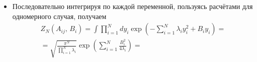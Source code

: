 \documentclass[a4paper]{article}
\begin{document}
\begin{itemize}
Диагональный вид матрицы $A$
 \[
	 \operatorname{diag}(\lambda_i)=
	 \begin{pmatrix} 12 & 0 & 0 \\ 0 & 6 & 0 \\ 0 & 0 & 2 \end{pmatrix} 
.\] 
\begin{multline*}
	A_{ij}x_i x_{j}=\mathbf{x}^TA\mathbf{x}=
	\mathbf{x}^T S^{-1} \operatorname{diag}(\lambda_i)S \mathbf{x}
	\xlongequal[]{S \text{ --- орт.}}
	\mathbf{x}^T S^T\operatorname{diag}(\lambda_i)S\mathbf{x}=\\=
	(S\mathbf{x})^T\operatorname{diag}(\lambda_i)(S\mathbf{x})\xlongequal[]{\mathbf{y}=S\mathbf{x}}\sum_{i=1}^{3} \lambda_i y_i^2
.\end{multline*} 
Удачной заменой координат в данном случае кажется $y_i=S_{ij} x_j$. Тогда выражение для произвольного кореллятора принимает вид
\begin{multline*}
\left<x_{a_1}x_{a_2}x_{a_3}\ldots x_{a_n} \right> =\\=
\frac{1}{Z_N(A_{ij})}
\int |\det S| \prod_{i=1}^{N}  dy_i \prod_{i=1}^{n} y_{a_i}
\exp \left(- \sum_{i=1}^{N} \lambda_i y_i^2\right)\xlongequal[]{S \text{ --- орт.}}\\=
\frac{1}{Z_N(A_{ij})}
\int \prod_{i=1}^{N}  dy_i \prod_{i=1}^{n} y_{a_i}
\exp \left(- \sum_{i=1}^{N} \lambda_i y_i^2\right)
,\end{multline*}
а также
\begin{multline*}
	Z_N (A_{ij},\,B_i)= \int |\det S| \prod_{i=1}^{N} dy_i
	\exp \left(-\sum_{i=1}^{N} \lambda_i y_i^2+ B_iy_i  \right) \xlongequal[]{S \text{ --- орт.}}\\= \int \prod_{i=1}^{N} dy_i
	\exp \left(-\sum_{i=1}^{N} \lambda_i y_i^2+ B_iy_i  \right) 
.\end{multline*} 
\item Последовательно интегрируя по каждой переменной, пользуясь
	расчётами для одномерного случая, получаем
\begin{multline*}
	Z_N (A_{ij},\,B_i)=\int \prod_{i=1}^{N} dy_i
	\exp \left(-\sum_{i=1}^{N} \lambda_i y_i^2+ B_iy_i  \right) =\\=\sqrt{\frac{\pi^N}{\prod_{i=1}^{N} \lambda_i }} \exp\left( \sum_{i=1}^{N} \frac{B_i^2}{4\lambda_i} \right) =

\end{multline*}
\end{itemize}
\end{document}
